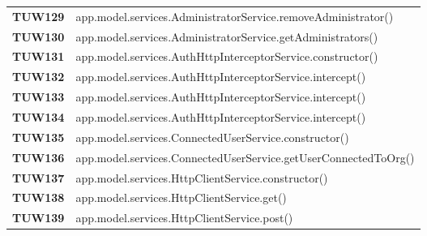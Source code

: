 \documentclass[../../piano-di-qualifica.tex]{subfiles}
\begin{document}
\begin{longtable}[H]{>{\centering\bfseries}m{3cm} >{}m{13cm}}
  TUW129             & app.model.services.AdministratorService.removeAdministrator\@()                                         \\

  TUW130             & app.model.services.AdministratorService.getAdministrators\@()                                           \\



  TUW131             & app.model.services.AuthHttpInterceptorService.constructor\@()                                           \\

  TUW132             & app.model.services.AuthHttpInterceptorService.intercept\@()                                             \\

  TUW133             & app.model.services.AuthHttpInterceptorService.intercept\@()                                             \\

  TUW134             & app.model.services.AuthHttpInterceptorService.intercept\@()                                             \\




  TUW135             & app.model.services.ConnectedUserService.constructor\@()                                                 \\

  TUW136             & app.model.services.ConnectedUserService.getUserConnectedToOrg\@()                                       \\



  TUW137             & app.model.services.HttpClientService.constructor\@()                                                    \\

  TUW138             & app.model.services.HttpClientService.get\@()                                                            \\

  TUW139             & app.model.services.HttpClientService.post\@()                                                           \\


\end{longtable}
\end{document}
